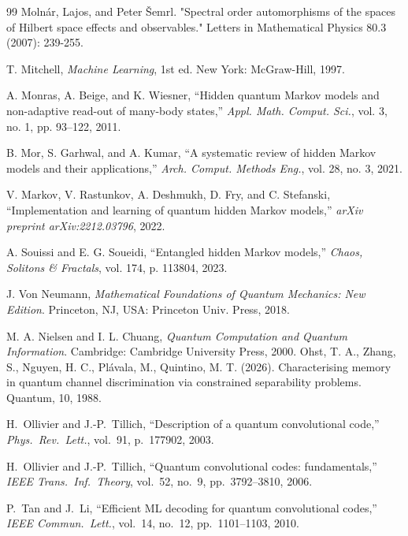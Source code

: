\documentclass[12pt, reco]{article}
\begin{document}
\begin{thebibliography}{99}
 Molnár, Lajos, and Peter Šemrl. "Spectral order automorphisms of the spaces of Hilbert space effects and observables." Letters in Mathematical Physics 80.3 (2007): 239-255.
    

T. Mitchell, \emph{Machine Learning}, 1st ed. New York: McGraw-Hill, 1997.

A. Monras, A. Beige, and K. Wiesner, ``Hidden quantum Markov models and non-adaptive read-out of many-body states,'' \emph{Appl. Math. Comput. Sci.}, vol. 3, no. 1, pp. 93--122, 2011.

B. Mor, S. Garhwal, and A. Kumar, ``A systematic review of hidden Markov models and their applications,'' \emph{Arch. Comput. Methods Eng.}, vol. 28, no. 3, 2021.

V. Markov, V. Rastunkov, A. Deshmukh, D. Fry, and C. Stefanski, ``Implementation and learning of quantum hidden Markov models,'' \emph{arXiv preprint arXiv:2212.03796}, 2022.

A. Souissi and E. G. Soueidi, ``Entangled hidden Markov models,'' \emph{Chaos, Solitons \& Fractals}, vol. 174, p. 113804, 2023.

J. Von Neumann, \emph{Mathematical Foundations of Quantum Mechanics: New Edition}. Princeton, NJ, USA: Princeton Univ. Press, 2018.

M. A. Nielsen and I. L. Chuang, \emph{Quantum Computation and Quantum Information}. Cambridge: Cambridge University Press, 2000.
 Ohst, T. A., Zhang, S., Nguyen, H. C., Plávala, M.,   Quintino, M. T. (2026). Characterising memory in quantum channel discrimination via constrained separability problems. Quantum, 10, 1988.

H.~Ollivier and J.-P.~Tillich,
``Description of a quantum convolutional code,''
\emph{Phys.\ Rev.\ Lett.}, vol.~91, p.~177902, 2003.

H.~Ollivier and J.-P.~Tillich,
``Quantum convolutional codes: fundamentals,''
\emph{IEEE Trans.\ Inf.\ Theory}, vol.~52, no.~9, pp.~3792--3810, 2006.

P.~Tan and J.~Li,
``Efficient ML decoding for quantum convolutional codes,''
\emph{IEEE Commun.\ Lett.}, vol.~14, no.~12, pp.~1101--1103, 2010.


\end{thebibliography}
\end{document}
